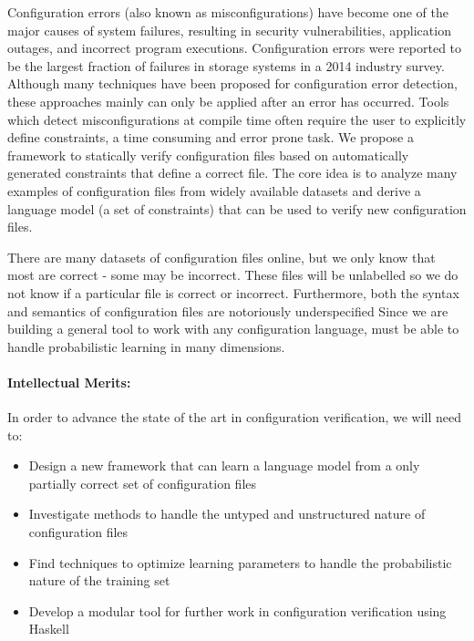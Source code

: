 Configuration errors (also known as misconfigurations) have become one of the major causes of system failures, resulting in security vulnerabilities, application outages, and incorrect program executions. 
Configuration errors were reported to be the largest fraction of failures in storage systems in a 2014 industry survey. 
Although many techniques have been proposed for configuration error detection, these approaches mainly can only be applied after an error has occurred.
Tools which detect misconfigurations at compile time often require the user to explicitly define constraints, a time consuming and error prone task.
We propose a framework to statically verify configuration files based on automatically generated constraints that define a correct file.
The core idea is to analyze many examples of configuration files from widely available datasets and derive a language model (a set of constraints) that can be used to verify new configuration files.

There are many datasets of configuration files online, but we only know that most are correct - some may be incorrect.
These files will be unlabelled so we do not know if a particular file is correct or incorrect.
Furthermore, both the syntax and semantics of configuration files are notoriously underspecified
Since we are building a general tool to work with any configuration language, \app must be able to handle probabilistic learning in many dimensions.

\paragraph{Intellectual Merits:} In order to advance the state of the art in configuration verification, we will need to:

\begin{itemize}
\item Design a new framework that can learn a language model from a only partially correct set of configuration files
\item Investigate methods to handle the untyped and unstructured nature of configuration files
\item Find techniques to optimize learning parameters to handle the probabilistic nature of the training set
\item Develop a modular tool for further work in configuration verification using Haskell
\end{itemize}

